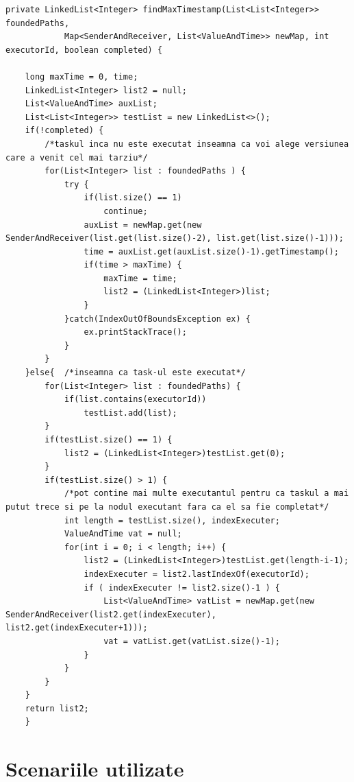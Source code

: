 \documentclass[12pt,a4paper]{report}
\begin{document}
\begin{lstlisting}[label={alg:findMaxTimestamp},caption={Aflarea versiunii potrivite}]
private LinkedList<Integer> findMaxTimestamp(List<List<Integer>> foundedPaths,
			Map<SenderAndReceiver, List<ValueAndTime>> newMap, int executorId, boolean completed) {
			
	long maxTime = 0, time;
	LinkedList<Integer> list2 = null;
	List<ValueAndTime> auxList;
	List<List<Integer>> testList = new LinkedList<>();
	if(!completed) {		
		/*taskul inca nu este executat inseamna ca voi alege versiunea care a venit cel mai tarziu*/
		for(List<Integer> list : foundedPaths ) {
			try {
				if(list.size() == 1)
					continue;
				auxList = newMap.get(new SenderAndReceiver(list.get(list.size()-2), list.get(list.size()-1)));		
				time = auxList.get(auxList.size()-1).getTimestamp(); 
				if(time > maxTime) {
					maxTime = time;
					list2 = (LinkedList<Integer>)list;
				}
			}catch(IndexOutOfBoundsException ex) {
				ex.printStackTrace();
			}
		}
	}else{	/*inseamna ca task-ul este executat*/
		for(List<Integer> list : foundedPaths) {
			if(list.contains(executorId))
				testList.add(list);
		}
		if(testList.size() == 1) {
			list2 = (LinkedList<Integer>)testList.get(0);
		}
		if(testList.size() > 1) {		
			/*pot contine mai multe executantul pentru ca taskul a mai putut trece si pe la nodul executant fara ca el sa fie completat*/
			int length = testList.size(), indexExecuter;
			ValueAndTime vat = null;
			for(int i = 0; i < length; i++) {	
				list2 = (LinkedList<Integer>)testList.get(length-i-1);
				indexExecuter = list2.lastIndexOf(executorId);
				if ( indexExecuter != list2.size()-1 ) {
					List<ValueAndTime> vatList = newMap.get(new SenderAndReceiver(list2.get(indexExecuter), list2.get(indexExecuter+1)));
					vat = vatList.get(vatList.size()-1);
				}	
			}
		}	
	}
	return list2;
	}
\end{lstlisting}
\newpage
\section{Scenariile utilizate} \label{scenariiUtilizate}
\end{document}
